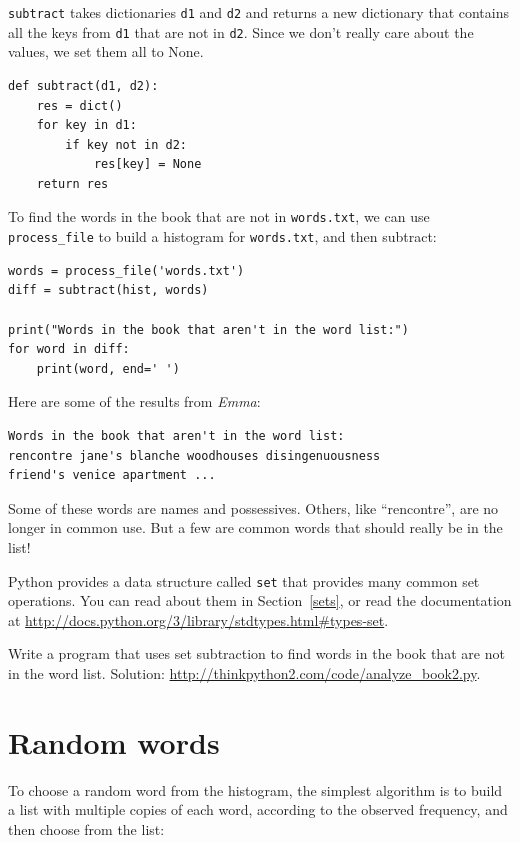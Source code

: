 \documentclass[10pt]{book}
\begin{document}
{\tt subtract} takes dictionaries {\tt d1} and {\tt d2} and returns a
new dictionary that contains all the keys from {\tt d1} that are not
in {\tt d2}.  Since we don't really care about the values, we
set them all to None.

\begin{verbatim}
def subtract(d1, d2):
    res = dict()
    for key in d1:
        if key not in d2:
            res[key] = None
    return res
\end{verbatim}
%
To find the words in the book that are not in {\tt words.txt},
we can use \verb"process_file" to build a histogram for
{\tt words.txt}, and then subtract:

\begin{verbatim}
words = process_file('words.txt')
diff = subtract(hist, words)

print("Words in the book that aren't in the word list:")
for word in diff:
    print(word, end=' ')
\end{verbatim}
%
Here are some of the results from {\em Emma}:

\begin{verbatim}
Words in the book that aren't in the word list:
rencontre jane's blanche woodhouses disingenuousness
friend's venice apartment ...
\end{verbatim}
%
Some of these words are names and possessives.  Others, like
``rencontre'', are no longer in common use.  But a few are common
words that should really be in the list!

\begin{exercise}

Python provides a data structure called {\tt set} that provides many
common set operations.  You can read about them in Section~\ref{sets},
or read the documentation at
\url{http://docs.python.org/3/library/stdtypes.html#types-set}.

Write a program that uses set subtraction to find words in the book
that are not in the word list.  Solution:
\url{http://thinkpython2.com/code/analyze_book2.py}.

\end{exercise}


\section{Random words}
\label{randomwords}

To choose a random word from the histogram, the simplest algorithm
is to build a list with multiple copies of each word, according
to the observed frequency, and then choose from the list:
\end{document}

